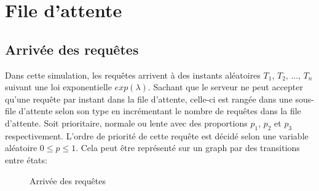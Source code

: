 \documentclass[12pt,a4paper]{article}
\begin{document}
    \newpage{}
    \section{File d'attente}
        
        \subsection{Arrivée des requêtes}

        \par Dans cette simulation, les requêtes arrivent à des instants aléatoires $T_1$, $T_2$, ..., $T_n$ suivant une loi exponentielle $exp(\lambda)$.\newline
        Sachant que le serveur ne peut accepter qu'une requête par instant dans la file d'attente, celle-ci est rangée dans une sous-file d'attente selon son type en incrémentant le nombre de requêtes dans la file d'attente.
        Soit prioritaire, normale ou lente avec des proportions $p_1$, $p_2$ et $p_3$ respectivement.\newline
        L'ordre de priorité de cette requête est décidé selon une variable aléatoire $0\leq p\leq 1$.
        Cela peut être représenté sur un graph par des transitions entre états: 
        
        \begin{figure}[H]
            \begin {center}
            \end{center}
            \caption{Arrivée des requêtes}
        \end{figure}
        
\end{document}
